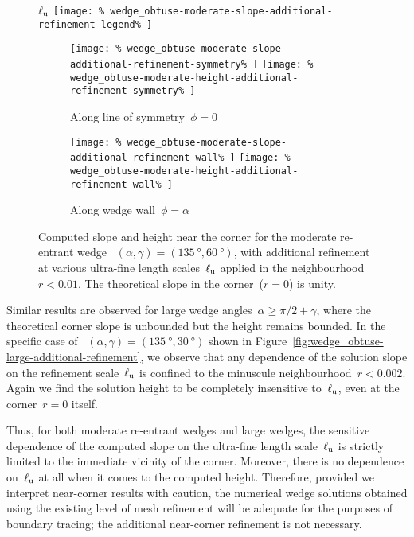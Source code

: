 \begin{figure}
  \newcommand*{\subfigurewidth}{0.45\textwidth}
  \centering
  $\ell_{\mathrm{u}}$
  \texttt{[image: \%
    wedge\_obtuse-moderate-slope-additional-refinement-legend\%
  ]}
  \hspace*{\fill}
  \begin{subfigure}[t]{\subfigurewidth}
    \texttt{[image: \%
      wedge\_obtuse-moderate-slope-additional-refinement-symmetry\%
    ]}
    \texttt{[image: \%
      wedge\_obtuse-moderate-height-additional-refinement-symmetry\%
    ]}
    \caption{%
      Along line of symmetry~$\phi = 0$
    }
    \label{fig:wedge_obtuse-moderate-additional-refinement-symmetry}
  \end{subfigure}
    \hfill
  \begin{subfigure}[t]{\subfigurewidth}
    \texttt{[image: \%
      wedge\_obtuse-moderate-slope-additional-refinement-wall\%
    ]}
    \texttt{[image: \%
      wedge\_obtuse-moderate-height-additional-refinement-wall\%
    ]}
    \caption{%
      Along wedge wall~$\phi = \alpha$
    }
    \label{fig:wedge_obtuse-moderate-additional-refinement-wall}
  \end{subfigure}
  \hspace*{\fill}
  \caption{
    Computed slope and height near the corner
    for the moderate re-entrant wedge~%
      $(\alpha, \gamma) = (\SI{135}{\degree}, \SI{60}{\degree})$,
    with additional refinement
    at various ultra-fine length scales~$\ell_{\mathrm{u}}$
    applied in the neighbourhood~$r < 0.01$.
    The theoretical slope in the corner~($r = 0$) is unity.
  }
  \label{fig:wedge_obtuse-moderate-additional-refinement}
\end{figure}

Similar results are observed
for large wedge angles~$\alpha \ge \pi/2 + \gamma$,
where the theoretical corner slope is unbounded
but the height remains bounded.
In the specific case of~%
  $(\alpha, \gamma) = (\SI{135}{\degree}, \SI{30}{\degree})$
shown in Figure~\ref{fig:wedge_obtuse-large-additional-refinement},
we observe that any dependence of the solution slope
on the refinement scale~$\ell_{\mathrm{u}}$
is confined to the minuscule neighbourhood~$r < 0.002$.
Again we find the solution height to be
completely insensitive to~$\ell_{\mathrm{u}}$,
even at the corner~$r = 0$ itself.

Thus, for both moderate re-entrant wedges and large wedges,
the sensitive dependence of the computed slope
on the ultra-fine length scale~$\ell_{\mathrm{u}}$
is strictly limited to the immediate vicinity of the corner.
Moreover, there is no dependence on~$\ell_{\mathrm{u}}$ at all
when it comes to the computed height.
Therefore, provided we interpret near-corner results with caution,
the numerical wedge solutions obtained
using the existing level of mesh refinement
will be adequate for the purposes of boundary tracing;
the additional near-corner refinement is not necessary.

